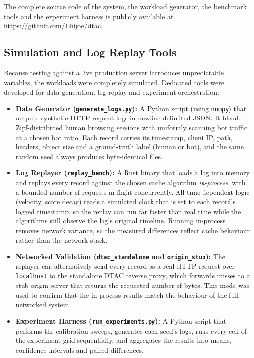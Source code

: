 The complete source code of the system, the workload generator, the benchmark tools and the experiment harness is publicly available at \url{https://github.com/Ehijoe/dtac}.

\subsection{Simulation and Log Replay Tools}
Because testing against a live production server introduces unpredictable variables, the workloads were completely simulated. Dedicated tools were developed for data generation, log replay and experiment orchestration:

\begin{itemize}
    \item \textbf{Data Generator (\texttt{generate\_logs.py}):} A Python script (using \texttt{numpy}) that outputs synthetic HTTP request logs in newline-delimited JSON. It blends Zipf-distributed human browsing sessions with uniformly scanning bot traffic at a chosen bot ratio. Each record carries its timestamp, client IP, path, headers, object size and a ground-truth label (human or bot), and the same random seed always produces byte-identical files.
    \item \textbf{Log Replayer (\texttt{replay\_bench}):} A Rust binary that loads a log into memory and replays every record against the chosen cache algorithm \emph{in-process}, with a bounded number of requests in flight concurrently. All time-dependent logic (velocity, score decay) reads a simulated clock that is set to each record's logged timestamp, so the replay can run far faster than real time while the algorithms still observe the log's original timeline. Running in-process removes network variance, so the measured differences reflect cache behaviour rather than the network stack.
    \item \textbf{Networked Validation (\texttt{dtac\_standalone} and \texttt{origin\_stub}):} The replayer can alternatively send every record as a real HTTP request over \texttt{localhost} to the standalone DTAC reverse proxy, which forwards misses to a stub origin server that returns the requested number of bytes. This mode was used to confirm that the in-process results match the behaviour of the full networked system.
    \item \textbf{Experiment Harness (\texttt{run\_experiments.py}):} A Python script that performs the calibration sweeps, generates each seed's logs, runs every cell of the experiment grid sequentially, and aggregates the results into means, confidence intervals and paired differences.
\end{itemize}

